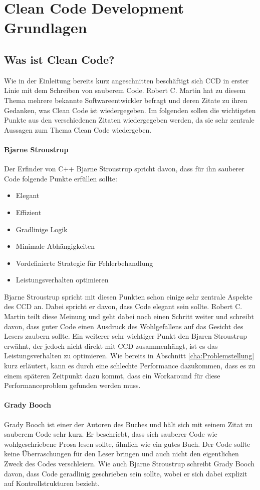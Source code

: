 \chapter{Clean Code Development Grundlagen}
\section{Was ist Clean Code?}
Wie in der Einleitung bereits kurz angeschnitten beschäftigt sich CCD in erster Linie mit dem Schreiben von sauberem Code. Robert C. Martin hat zu diesem Thema mehrere bekannte Softwareentwickler befragt und deren Zitate zu ihren Gedanken, was Clean Code ist wiedergegeben. Im folgenden sollen die wichtigsten Punkte aus den verschiedenen Zitaten wiedergegeben werden, da sie sehr zentrale Aussagen zum Thema Clean Code wiedergeben.

\subsubsection{Bjarne Stroustrup}
Der Erfinder von C++ Bjarne Stroustrup spricht davon, dass für ihn sauberer Code folgende Punkte erfüllen sollte:

\begin{itemize}
	\item Elegant
	\item Effizient
	\item Gradlinige Logik
	\item Minimale Abhängigkeiten
	\item Vordefinierte Strategie für Fehlerbehandlung
	\item Leistungsverhalten optimieren
\end{itemize}

Bjarne Stroustrup spricht mit diesen Punkten schon einige sehr zentrale Aspekte des CCD an. Dabei spricht er davon, dass Code elegant sein sollte. Robert C. Martin teilt diese Meinung und geht dabei noch einen Schritt weiter und schreibt davon, dass guter Code einen Ausdruck des Wohlgefallens auf das Gesicht des Lesers zaubern sollte. Ein weiterer sehr wichtiger Punkt den Bjaren Stroustrup erwähnt, der jedoch nicht direkt mit CCD zusammenhängt, ist es das Leistungsverhalten zu optimieren. Wie bereits in Abschnitt \ref{cha:Problemstellung} kurz erläutert, kann es durch eine schlechte Performance dazukommen, dass es zu einem späteren Zeitpunkt dazu kommt, dass ein Workaround für diese Performanceproblem gefunden werden muss.

\subsubsection{Grady Booch}
Grady Booch ist einer der Autoren des Buches \cite{Booch2004} und hält sich mit seinem Zitat zu sauberem Code sehr kurz. Er beschriebt, dass sich sauberer Code wie wohlgeschriebene Prosa lesen sollte, ähnlich wie ein gutes Buch. Der Code sollte keine Überraschungen für den Leser bringen und auch nicht den eigentlichen Zweck des Codes verschleiern. Wie auch Bjarne Stroustrup schreibt Grady Booch davon, dass Code geradlinig geschrieben sein sollte, wobei er sich dabei explizit auf Kontrollstrukturen bezieht.

